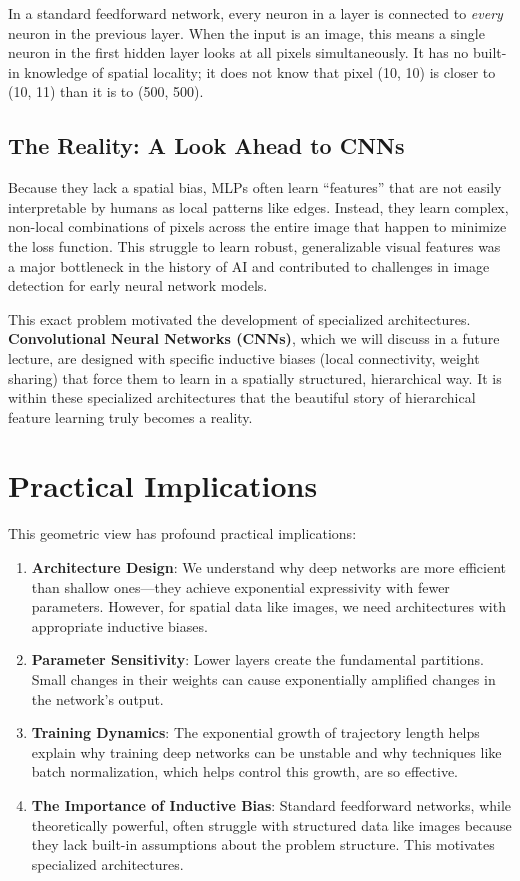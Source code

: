 \documentclass[11pt]{article}
\begin{document}
In a standard feedforward network, every neuron in a layer is connected to \textit{every} neuron in the previous layer. When the input is an image, this means a single neuron in the first hidden layer looks at all pixels simultaneously. It has no built-in knowledge of spatial locality; it does not know that pixel (10, 10) is closer to (10, 11) than it is to (500, 500).

\subsection{The Reality: A Look Ahead to CNNs}
Because they lack a spatial bias, MLPs often learn ``features'' that are not easily interpretable by humans as local patterns like edges. Instead, they learn complex, non-local combinations of pixels across the entire image that happen to minimize the loss function. This struggle to learn robust, generalizable visual features was a major bottleneck in the history of AI and contributed to challenges in image detection for early neural network models.

This exact problem motivated the development of specialized architectures. \textbf{Convolutional Neural Networks (CNNs)}, which we will discuss in a future lecture, are designed with specific inductive biases (local connectivity, weight sharing) that force them to learn in a spatially structured, hierarchical way. It is within these specialized architectures that the beautiful story of hierarchical feature learning truly becomes a reality.

\section{Practical Implications}
This geometric view has profound practical implications:
\begin{enumerate}
    \item \textbf{Architecture Design}: We understand why deep networks are more efficient than shallow ones—they achieve exponential expressivity with fewer parameters. However, for spatial data like images, we need architectures with appropriate inductive biases.
    
    \item \textbf{Parameter Sensitivity}: Lower layers create the fundamental partitions. Small changes in their weights can cause exponentially amplified changes in the network's output.
    
    \item \textbf{Training Dynamics}: The exponential growth of trajectory length helps explain why training deep networks can be unstable and why techniques like batch normalization, which helps control this growth, are so effective.
    
    \item \textbf{The Importance of Inductive Bias}: Standard feedforward networks, while theoretically powerful, often struggle with structured data like images because they lack built-in assumptions about the problem structure. This motivates specialized architectures.
\end{enumerate}
\end{document}
